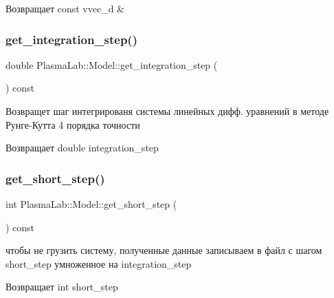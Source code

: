 \begin{DoxyReturn}{Возвращает}
const vvec\+\_\+d \& 
\end{DoxyReturn}
\mbox{\label{class_plasma_lab_1_1_model_a757a74457265385a0bf8860a31c23c29}} 
\subsubsection{\texorpdfstring{get\+\_\+integration\+\_\+step()}{get\_integration\_step()}}
{\footnotesize\ttfamily double Plasma\+Lab\+::\+Model\+::get\+\_\+integration\+\_\+step (\begin{DoxyParamCaption}{ }\end{DoxyParamCaption}) const\hspace{0.3cm}{\ttfamily [inline]}}

Возвращет шаг интегрированя системы линейных дифф. уравнений в методе Рунге-\/Кутта 4 порядка точности \begin{DoxyReturn}{Возвращает}
double integration\+\_\+step 
\end{DoxyReturn}
\mbox{\label{class_plasma_lab_1_1_model_a4c338e79fdbe777204eec309cfef4717}} 
\subsubsection{\texorpdfstring{get\+\_\+short\+\_\+step()}{get\_short\_step()}}
{\footnotesize\ttfamily int Plasma\+Lab\+::\+Model\+::get\+\_\+short\+\_\+step (\begin{DoxyParamCaption}{ }\end{DoxyParamCaption}) const\hspace{0.3cm}{\ttfamily [inline]}}

чтобы не грузить систему, полученные данные записываем в файл с шагом short\+\_\+step умноженное на integration\+\_\+step \begin{DoxyReturn}{Возвращает}
int short\+\_\+step 
\end{DoxyReturn}
\mbox{\label{class_plasma_lab_1_1_model_abc0c99cb3acd4a85ab1b4f7165c51a83}} 
